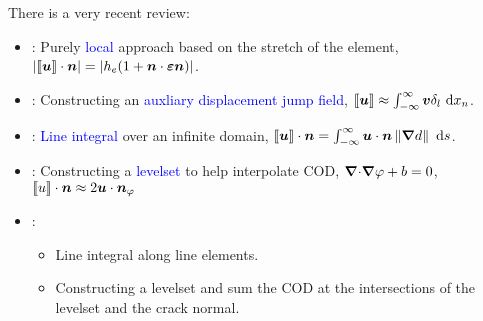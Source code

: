 \begin{frame}
    There is a very recent review: \cite{heider2021review}

    \bigskip

    \begin{itemize}
        \setlength\itemsep{1em}
        \item<1-> \cite{miehe2015minimization,wilson2016phase}: Purely \textcolor{blue}{local} approach based on the stretch of the element, $\left\vert\left\llbracket\boldsymbol{u}\right\rrbracket\cdot\boldsymbol{n}\right\vert = \left\vert h_e (1+\boldsymbol{n}\cdot\boldsymbol{\varepsilon}\boldsymbol{n})\right\vert$.
        \item<2-> \cite{verhoosel2013phase}: Constructing an \textcolor{blue}{auxliary displacement jump field}, $\left\llbracket\boldsymbol{u}\right\rrbracket \approx \int_{-\infty}^\infty \boldsymbol{v} \delta_l \text{ d}{x_n} $.
        \item<3-> \cite{yoshioka2016variational}: \textcolor{blue}{Line integral} over an infinite domain, $\left\llbracket\boldsymbol{u}\right\rrbracket\cdot\boldsymbol{n} = \int_{-\infty}^\infty \boldsymbol{u} \cdot \boldsymbol{n} \left\lVert\boldsymbol{\nabla} d\right\rVert \text{ d}{s}$.
        \item<4-> \cite{lee2017iterative}: Constructing a \textcolor{blue}{levelset} to help interpolate COD, ${\boldsymbol{\nabla} \cdot} \boldsymbol{\nabla} \varphi + b = 0$, $\left\llbracket u\right\rrbracket\cdot\boldsymbol{n} \approx 2 \boldsymbol{u} \cdot \boldsymbol{n}_\varphi$
        \item<5-> \cite{yoshioka2020crack}:
            \begin{itemize}
                \item Line integral along line elements.
                \item Constructing a levelset and sum the COD at the intersections of the levelset and the crack normal.
            \end{itemize}
    \end{itemize}

    \bigskip

\end{frame}
